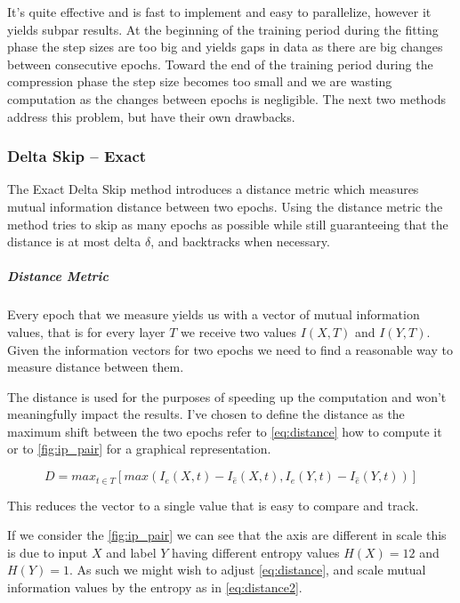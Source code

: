   It's quite effective and is fast to implement and easy to parallelize, however
  it yields subpar results. At the beginning of the training period during the
  fitting phase the step sizes are too big and yields gaps in data as there are
  big changes between consecutive epochs. Toward the end of the training period
  during the compression phase the step size becomes too small and we are
  wasting computation as the changes between epochs is negligible. The next two
  methods address this problem, but have their own drawbacks.

\subsubsection{Delta Skip -- Exact}

  The Exact Delta Skip method introduces a distance metric which measures
  mutual information distance between two epochs. Using the distance metric the
  method tries to skip as many epochs as possible while still guaranteeing that
  the distance is at most delta $\delta$, and backtracks when necessary.

  \subparagraph{Distance Metric}
  Every epoch that we measure yields us with a vector of mutual information
  values, that is for every layer $T$ we receive two values $I(X,T)$ and
  $I(Y,T)$. Given the information vectors for two epochs we need to find a
  reasonable way to measure distance between them.

  The distance is used for the purposes of speeding up the computation and won't
  meaningfully impact the results. I've chosen to define the distance as the
  maximum shift between the two epochs refer to \autoref{eq:distance} how to
  compute it or to \autoref{fig:ip_pair} for a graphical representation.

  \begin{equation}
    D = max_{t\in T} [max( I_e(X, t) - I_{\hat{e}}(X, t), I_e(Y, t) - I_{\hat{e}}(Y, t))]
    \label{eq:distance}
  \end{equation} 

  This reduces the vector to a single value that is easy to compare and track. 

  If we consider the \autoref{fig:ip_pair} we can see that the axis are
  different in scale this is due to input $X$ and label $Y$ having different
  entropy values $ H(X) = 12 $ and $ H(Y) = 1 $. As such we might wish to adjust
  \autoref{eq:distance}, and scale mutual information values by the entropy as
  in \autoref{eq:distance2}.

